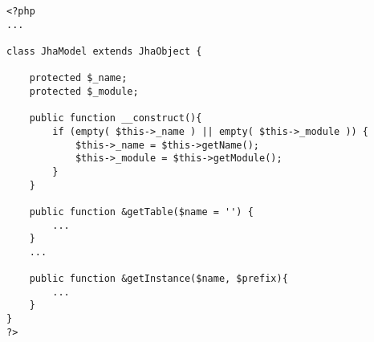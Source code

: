 \begin{lstlisting}[label=jha_model,caption=JhaModel.]
<?php
...

class JhaModel extends JhaObject {
	
	protected $_name;
	protected $_module;
	
    public function __construct(){
        if (empty( $this->_name ) || empty( $this->_module )) {
            $this->_name = $this->getName();
            $this->_module = $this->getModule();
        }
    }
    
    public function &getTable($name = '') {
    	...
    }
    ...
    
    public function &getInstance($name, $prefix){
        ...
    }
}
?>
\end{lstlisting}
